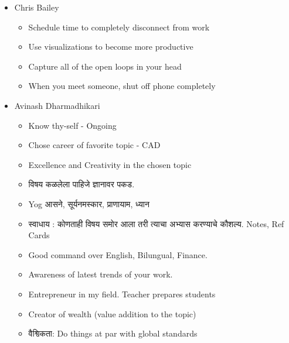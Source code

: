 \begin{itemize}[noitemsep,nolistsep]
\item Chris Bailey
	\begin{itemize}[noitemsep,nolistsep]
	\item Schedule time to completely disconnect from work
	\item Use visualizations to become more productive
	\item Capture all of the open loops in your head
	\item When you meet someone, shut off phone completely
	\end{itemize}

\item Avinash Dharmadhikari
	\begin{itemize}[noitemsep,nolistsep]
	\item Know thy-self - Ongoing
	\item Chose career of favorite topic - CAD
	\item Excellence and Creativity in the chosen topic
	\item \foreignlanguage{sanskrit}{विषय कळलेला पाहिजे ज्ञानावर पकड}. 
	\item Yog \foreignlanguage{sanskrit}{आसने, सूर्यनमस्कार, प्राणायाम, ध्यान}
	\item \foreignlanguage{sanskrit}{स्वाधाय : कोणताही विषय समोर आला तरी त्याचा अभ्यास करण्याचे कौशल्य}. Notes, Ref Cards
	\item Good command over English, Bilungual, Finance.
	\item Awareness of latest trends of your work.
	\item Entrepreneur in my field.  Teacher prepares students
	\item Creator of wealth (value addition to the topic)  
	\item \foreignlanguage{sanskrit}{वैश्विकता}: Do things at par with global standards
	\end{itemize}


\end{itemize}
